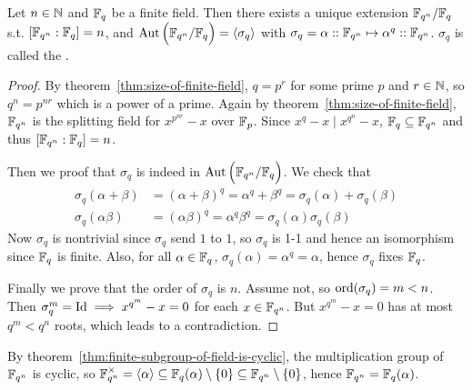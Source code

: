 \begin{theorem} \label{thm:aut-of-finite-field}
  Let $n \in \mathbb{N}$ and $\mathbb{F}_q$ be a finite field. Then there exists
  a unique extension $\mathbb{F}_{q^n} / \mathbb{F}_q$ s.t. $[\mathbb{F}_{q^n} : \mathbb{F}_q] = n$, and
  $\operatorname{Aut} \Big( \mathbb{F}_{q^n} / \mathbb{F}_q \Big) = \langle\sigma_q\rangle$ with
  $\sigma_q = \alpha :: \mathbb{F}_{q^n} \mapsto \alpha^q :: \mathbb{F}_{q^n}$.
  $\sigma_q$ is called the \emph{}.

  \begin{proof}
    By theorem~\ref{thm:size-of-finite-field},
    $q = p^r$ for some prime $p$ and $r \in \mathbb{N}$, so $q^n = p^{nr}$ which is a power of
    a prime. Again by theorem~\ref{thm:size-of-finite-field},
    $\mathbb{F}_{q^n}$ is the splitting field for $x^{p^{nr}} - x$ over $\mathbb{F}_p$.
    Since $x^q - x \mid x^{q^n} - x$, $\mathbb{F}_q \subseteq \mathbb{F}_{q^n}$ and thus $[\mathbb{F}_{q^n}: \mathbb{F}_{q}] = n$.

    Then we proof that $\sigma_q$ is indeed in $\operatorname{Aut} \Big( {\mathbb{F}_{q^n}}/{\mathbb{F}_q} \Big)$.
    We check that
    \[
      \begin{aligned}
        \sigma_q(\alpha+\beta) &= (\alpha+\beta)^q = \alpha^q + \beta^q = \sigma_q(\alpha) + \sigma_q(\beta) \\
        \sigma_q(\alpha\beta) &= (\alpha\beta)^q = \alpha^q \beta^q = \sigma_q(\alpha) \sigma_q(\beta)
      \end{aligned}
    \]
    Now $\sigma_q$ is nontrivial since $\sigma_q$ send $1$ to $1$, so $\sigma_q$ is 1-1 and hence an
    isomorphism since $\mathbb{F}_q$ is finite. Also, for all $\alpha \in \mathbb{F}_q$, $\sigma_q(\alpha)
    = \alpha^{q} = \alpha$, hence $\sigma_q$ fixes $\mathbb{F}_q$.

    Finally we prove that the order of $\sigma_q$ is $n$. Assume not, so $\operatorname{ord}(\sigma_q) = m < n$.
    Then $\sigma_q^m = {\rm Id} \implies x^{q^m} - x=0$ for each $x \in \mathbb{F}_{q^n}$.
    But $x^{q^m} - x = 0$ has at most $q^m < q^n$ roots, which leads to a contradiction.
  \end{proof}
\end{theorem}

\begin{remark}
  By theorem~\ref{thm:finite-subgroup-of-field-is-cyclic}, the multiplication group
  of $\mathbb{F}_{q^n}$ is cyclic, so $\mathbb{F}_{q^n}^\times = \langle \alpha \rangle
  \subseteq \mathbb{F}_q(\alpha) \setminus \{0\} \subseteq \mathbb{F}_{q^n} \setminus \{0\}$,
  hence $\mathbb{F}_{q^n} = \mathbb{F}_q(\alpha)$.
\end{remark}

